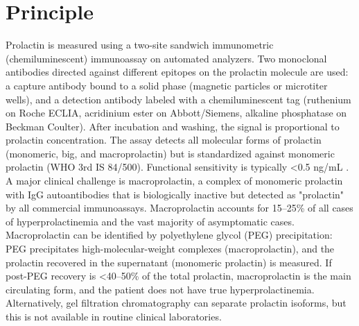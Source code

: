 \section*{Principle}
Prolactin is measured using a two-site sandwich immunometric (chemiluminescent) immunoassay on automated analyzers. Two monoclonal antibodies directed against different epitopes on the prolactin molecule are used: a capture antibody bound to a solid phase (magnetic particles or microtiter wells), and a detection antibody labeled with a chemiluminescent tag (ruthenium on Roche ECLIA, acridinium ester on Abbott/Siemens, alkaline phosphatase on Beckman Coulter). After incubation and washing, the signal is proportional to prolactin concentration. The assay detects all molecular forms of prolactin (monomeric, big, and macroprolactin) but is standardized against monomeric prolactin (WHO 3rd IS 84/500). Functional sensitivity is typically <0.5 ng/mL \cite{tietz2012textbook}. A major clinical challenge is macroprolactin, a complex of monomeric prolactin with IgG autoantibodies that is biologically inactive but detected as "prolactin" by all commercial immunoassays. Macroprolactin accounts for 15--25\% of all cases of hyperprolactinemia and the vast majority of asymptomatic cases. Macroprolactin can be identified by polyethylene glycol (PEG) precipitation: PEG precipitates high-molecular-weight complexes (macroprolactin), and the prolactin recovered in the supernatant (monomeric prolactin) is measured. If post-PEG recovery is <40--50\% of the total prolactin, macroprolactin is the main circulating form, and the patient does not have true hyperprolactinemia. Alternatively, gel filtration chromatography can separate prolactin isoforms, but this is not available in routine clinical laboratories.

